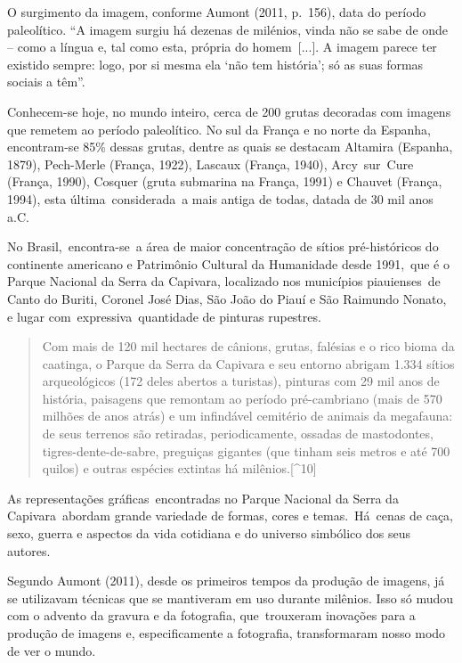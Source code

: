 \documentclass[
  letterpaper,
]{scrbook}
\begin{document}
O surgimento da imagem, conforme Aumont (2011, p.~156), data do período
paleolítico. ``A imagem surgiu há dezenas de milénios, vinda não se sabe
de onde -- como a língua e, tal como esta, própria do homem~{[}...{]}. A
imagem parece ter existido sempre: logo, por si mesma ela `não tem
história'; só as suas formas sociais a têm''.~

Conhecem-se hoje, no mundo inteiro, cerca de 200 grutas decoradas com
imagens que remetem ao período paleolítico. No sul da França e no norte
da Espanha, encontram-se 85\% dessas grutas, dentre as quais se destacam
Altamira (Espanha, 1879), Pech-Merle (França, 1922), Lascaux (França,
1940), Arcy~sur~Cure (França, 1990), Cosquer (gruta submarina na França,
1991) e Chauvet (França, 1994), esta última~considerada~a mais antiga de
todas, datada de 30 mil anos a.C.

No Brasil,~encontra-se~a área de maior concentração de sítios
pré-históricos do continente americano e Patrimônio Cultural da
Humanidade desde 1991,~que é o Parque Nacional da Serra da Capivara,
localizado nos municípios piauienses~de Canto do Buriti, Coronel José
Dias, São João do Piauí e São Raimundo Nonato, e lugar
com~expressiva~quantidade de pinturas rupestres.~ ~

\begin{quote}
Com mais de 120 mil hectares de cânions, grutas, falésias e o rico bioma
da caatinga, o Parque da Serra da Capivara e seu entorno abrigam 1.334
sítios arqueológicos (172 deles abertos a turistas), pinturas com 29 mil
anos de história, paisagens que remontam ao período pré-cambriano (mais
de 570 milhões de anos atrás) e um infindável cemitério de animais da
megafauna: de seus terrenos são retiradas, periodicamente, ossadas de
mastodontes, tigres-dente-de-sabre, preguiças gigantes (que tinham seis
metros e até 700 quilos) e outras espécies extintas há
milênios.{[}\^{}10{]} ~
\end{quote}

As representações gráficas~encontradas no Parque Nacional da Serra da
Capivara~abordam grande variedade de formas, cores e temas.~Há~cenas de
caça, sexo, guerra e aspectos da vida cotidiana e do universo simbólico
dos seus autores.~

Segundo Aumont (2011), desde os primeiros tempos da produção de imagens,
já se utilizavam técnicas que se mantiveram em uso durante milênios.
Isso só mudou com o advento da gravura e da fotografia, que~trouxeram
inovações para a produção de imagens e, especificamente a fotografia,
transformaram nosso modo de ver o mundo.~
\end{document}
